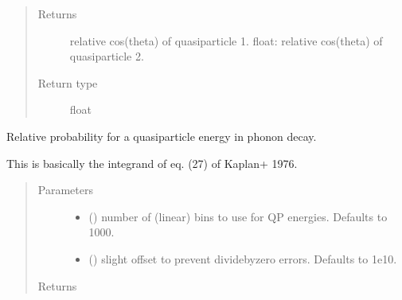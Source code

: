 \documentclass[letterpaper,10pt,english]{sphinxmanual}
\begin{document}
\begin{fulllineitems}
\begin{fulllineitems}
\begin{quote}
\begin{description}
\item[{Returns}] \leavevmode
relative cos(theta) of quasiparticle 1.
float: relative cos(theta) of quasiparticle 2.

\item[{Return type}] \leavevmode
float

\end{description}\end{quote}

\end{fulllineitems}


\begin{fulllineitems}
\label{\detokenize{code_structure:scdc.interaction.PhononDecayToQuasiparticles.qp_energy_distribution}}
Relative probability for a quasiparticle energy in phonon decay.

This is basically the integrand of eq. (27) of Kaplan+ 1976.
\begin{quote}\begin{description}
\item[{Parameters}] \leavevmode\begin{itemize}
\item {} 
 (\sphinxstyleliteralemphasis{\sphinxupquote{, }}) \textendash{} number of (linear) bins to use for QP
energies. Defaults to 1000.

\item {} 
 (\sphinxstyleliteralemphasis{\sphinxupquote{, }}) \textendash{} slight offset to prevent divide\sphinxhyphen{}by\sphinxhyphen{}zero
errors. Defaults to 1e\sphinxhyphen{}10.

\end{itemize}

\item[{Returns}] \leavevmode


\end{description}
\end{quote}
\end{fulllineitems}
\end{fulllineitems}
\end{document}

